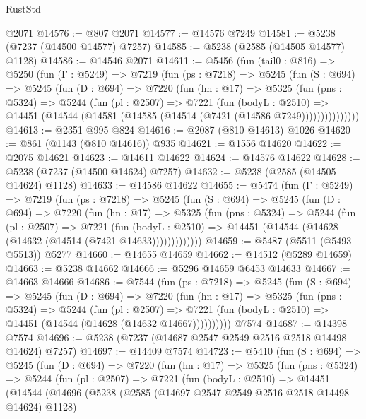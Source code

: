 \begin{lexlean}{RustStd}
\begin{coremodule}
    @2071
@14576 := @807 @2071
@14577 := @14576 @7249
@14581 := @5238 (@7237 (@14500 @14577) @7257)
@14585 := @5238 (@2585 (@14505 @14577) @1128)
@14586 := @14546 @2071
@14611 := @5456
    (fun (tail0 : @816) =>
    @5250
      (fun (Γ : @5249) =>
      @7219
        (fun (ps : @7218) =>
        @5245
          (fun (S : @694) =>
          @5245
            (fun (D : @694) =>
            @7220
              (fun (hn : @17) =>
              @5325
                (fun (pns : @5324) =>
                @5244
                  (fun (pl : @2507) =>
                  @7221
                    (fun (bodyL : @2510) =>
                    @14451 (@14544 (@14581 (@14585 (@14514 (@7421 (@14586 @7249)))))))))))))))
@14613 := @2351 @995 @824
@14616 := @2087 (@810 @14613) @1026
@14620 := @861 (@1143 (@810 @14616)) @935
@14621 := @1556 @14620
@14622 := @2075 @14621
@14623 := @14611 @14622
@14624 := @14576 @14622
@14628 := @5238 (@7237 (@14500 @14624) @7257)
@14632 := @5238 (@2585 (@14505 @14624) @1128)
@14633 := @14586 @14622
@14655 := @5474
    (fun (Γ : @5249) =>
    @7219
      (fun (ps : @7218) =>
      @5245
        (fun (S : @694) =>
        @5245
          (fun (D : @694) =>
          @7220
            (fun (hn : @17) =>
            @5325
              (fun (pns : @5324) =>
              @5244
                (fun (pl : @2507) =>
                @7221
                  (fun (bodyL : @2510) =>
                  @14451 (@14544 (@14628 (@14632 (@14514 (@7421 @14633)))))))))))))
@14659 := @5487 (@5511 (@5493 @5513)) @5277
@14660 := @14655 @14659
@14662 := @14512 (@5289 @14659)
@14663 := @5238 @14662
@14666 := @5296 @14659 @6453 @14633
@14667 := @14663 @14666
@14686 := @7544
    (fun (ps : @7218) =>
    @5245
      (fun (S : @694) =>
      @5245
        (fun (D : @694) =>
        @7220
          (fun (hn : @17) =>
          @5325
            (fun (pns : @5324) =>
            @5244
              (fun (pl : @2507) =>
              @7221 (fun (bodyL : @2510) => @14451 (@14544 (@14628 (@14632 @14667))))))))))
    @7574
@14687 := @14398 @7574
@14696 := @5238 (@7237 (@14687 @2547 @2549 @2516 @2518 @14498 @14624) @7257)
@14697 := @14409 @7574
@14723 := @5410
    (fun (S : @694) =>
    @5245
      (fun (D : @694) =>
      @7220
        (fun (hn : @17) =>
        @5325
          (fun (pns : @5324) =>
          @5244
            (fun (pl : @2507) =>
            @7221
              (fun (bodyL : @2510) =>
              @14451
                (@14544
                  (@14696
                    (@5238
                      (@2585 (@14697 @2547 @2549 @2516 @2518 @14498 @14624) @1128)

\end{coremodule}
\end{lexlean}
